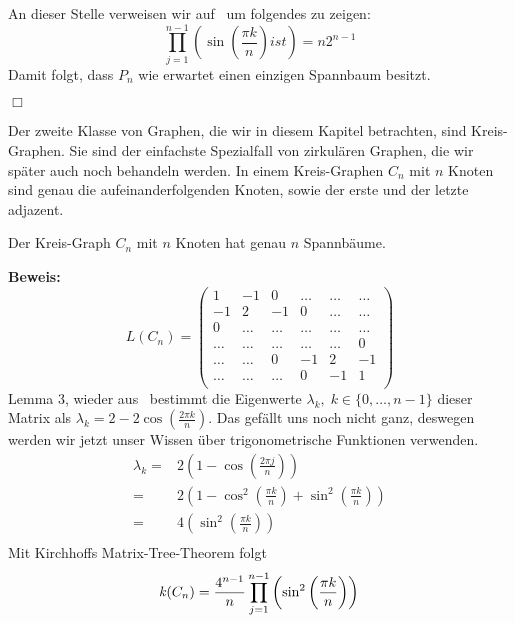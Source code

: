 An dieser Stelle verweisen wir auf~\cite{fiktor_2010} um folgendes zu zeigen:
\begin{equation}
 \prod_{j=1}^{n-1} \left(\sin\left(\frac{\pi k}{n}\right) ist \right)=n2^{n-1}
 \label{fiktor}
\end{equation}
Damit folgt, dass $P_n$ wie erwartet einen einzigen Spannbaum besitzt.
\begin{flushright} $\Box$ \end{flushright}
Der zweite Klasse von Graphen, die wir in diesem Kapitel betrachten, sind Kreis-Graphen.
Sie sind der einfachste Spezialfall von zirkulären Graphen, die wir später auch noch behandeln werden. In einem Kreis-Graphen $C_n$ mit $n$ Knoten sind genau die aufeinanderfolgenden Knoten, sowie der erste und der letzte adjazent. 
\begin{Lms}
 Der Kreis-Graph $C_n$ mit $n$ Knoten hat genau $n$ Spannbäume.
\end{Lms}
\textbf{Beweis:}
\begin{equation}
L(C_n)=
\begin{pmatrix}
1&-1&0&\ldots&\ldots&\ldots\\
-1&2&-1&0&\ldots&\ldots\\
0&\ldots&\ldots&\ldots&\ldots&\ldots\\
\ldots&\ldots&\ldots&\ldots&\ldots&0\\
\ldots&\ldots&0&-1&2&-1\\
\ldots&\ldots&\ldots&0&-1&1\\
\end{pmatrix}
\end{equation}
Lemma 3, wieder aus~\cite{daoud_2014} bestimmt die Eigenwerte $\lambda_k,\; k \in \{0,\ldots,n-1\}$
dieser Matrix als $\lambda_k = 2-2\cos {\left(\frac{2\pi k}{n}\right)}$.
Das gefällt uns noch nicht ganz, deswegen werden wir jetzt unser Wissen über trigonometrische Funktionen verwenden.
\begin{equation}
\begin{split}
 \lambda_k={} & 2 \left(1-\cos \left(\frac{2\pi j}{n}\right)\right)\\
 = {}&2 \left( 1 - \cos^2\left(\frac{\pi k}{n}\right)+\sin^2\left(\frac{\pi k}{n}\right) \right)\\
 = {}& 4 \left(\sin^2\left(\frac{\pi k}{n}\right) \right)\\
\end{split}
\label{ewc}
\end{equation}
Mit Kirchhoffs Matrix-Tree-Theorem folgt
\begin{equation}
 \mathit{k}(C_n)=\frac{4^{n-1}}{n}\prod_{j=1}^{n-1} \left(\sin^2\left(\frac{\pi k}{n}\right) \right)\\
\end{equation}

